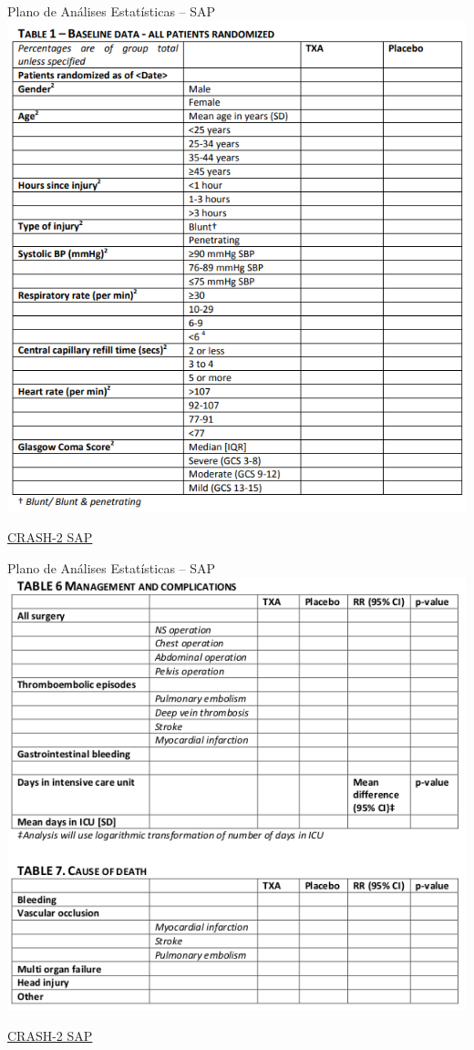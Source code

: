 \documentclass{beamer}
\begin{document}
\begin{frame}{Plano de Análises Estatísticas -- SAP}
  \centering
  \includegraphics[height=.9\textheight]{Planejamento/CRASH-SAP2}

  \vfill
  \scriptsize
  \hfill \href{http://www.crash2.lshtm.ac.uk/Images/SAP.pdf}{CRASH-2 SAP}
\end{frame}

\begin{frame}{Plano de Análises Estatísticas -- SAP}
  \centering
  \includegraphics[height=.9\textheight]{Planejamento/CRASH-SAP3}

  \vfill
  \scriptsize
  \hfill \href{http://www.crash2.lshtm.ac.uk/Images/SAP.pdf}{CRASH-2 SAP}
\end{frame}
\end{document}
